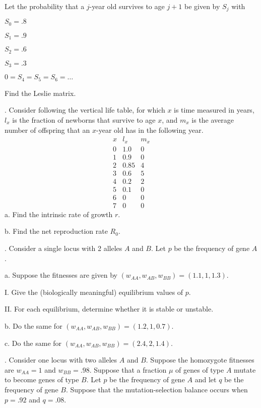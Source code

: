 \documentclass[reqno,12pt]{amsart}
\begin{document}
\noindent
Let the probability that a $j$-year old survives to age $j+1$
be given by $S_j$ with

$S_0 = .8$

$S_1 = .9$

$S_2 = .6$

$S_3 = .3$

$0 = S_4 = S_5 = S_6 = \dots$

\noindent
Find the Leslie matrix.

\vspace{1cm}

. Consider following the vertical life table, for which
$x$ is time measured in years, $l_x$ is the fraction of
newborns that survive to age $x$, and $m_x$ is the average
number of offspring that an $x$-year old has in the following
year.
$$
\begin{matrix}
x & l_x  & m_x \\  \hline
0 & 1.0  & 0   \\
1 & 0.9  & 0   \\
2 & 0.85 & 4   \\
3 & 0.6  & 5   \\
4 & 0.2  & 2   \\
5 & 0.1  & 0   \\
6 &  0   & 0   \\
7 &  0   & 0
\end{matrix}
$$
a.  Find the intrinsic rate of growth $r$.

\noindent
b.  Find the net reproduction rate $R_0$.

\vspace{1cm}

.  Consider a single locus with 2 alleles $A$ and $B$.  Let
$p$ be the frequency of gene $A$.

\noindent
a.  Suppose the fitnesses are given by
$(w_{AA},w_{AB},w_{BB}) = (1.1 , 1, 1.3)$.

I. \hspace{.04cm} Give the (biologically meaningful) equilibrium
values of $p$.

II. For each equilibrium, determine whether it is stable or unstable.

\noindent
b.  Do the same for $(w_{AA},w_{AB},w_{BB}) = (1.2 , 1, 0.7)$.

\noindent
c.  Do the same for $(w_{AA},w_{AB},w_{BB}) = (2.4 , 2, 1.4)$.

\vspace{1cm}

.  Consider one locus with two alleles $A$ and $B$.  Suppose
the homozygote fitnesses are $w_{AA} = 1$ and $w_{BB} = .98$.
Suppose that a fraction $\mu$ of genes of type $A$ mutate to
become genes of type $B$.  Let $p$ be the frequency of gene $A$
and let $q$ be the frequency of gene $B$.  Suppose that the
mutation-selection balance occurs when $p=.92$ and $q=.08$.
\end{document}
